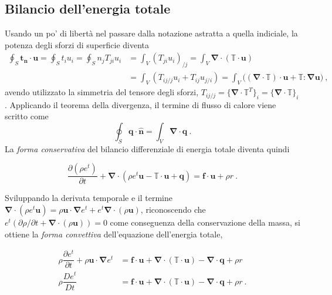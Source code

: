 \subsection{Bilancio dell'energia totale}
Usando un po' di libertà nel passare dalla notazione astratta a quella indiciale, la potenza degli sforzi di superficie diventa
\begin{equation}
\begin{aligned}
 \oint_S \bm{t_n} \cdot \bm{u} = \oint_S t_i u_i = \oint_S n_j T_{ji} u_i & =
  \int_V (T_{ji} u_i)_{/j}= \int_V \bm{\nabla} \cdot ( \mathbb{T} \cdot \bm{u}) \\
  & = \int_V (T_{ij/j} u_i + T_{ij} u_{j/i}) = \int_V \big( (\bm{\nabla} \cdot \mathbb{T}) \cdot \bm{u} + \mathbb{T} : \bm{\nabla} \bm{u} \big) \ , 
\end{aligned} 
\end{equation}
avendo utilizzato la simmetria del tensore degli sforzi, $T_{ij/j} = \{ \bm{\nabla} \cdot \mathbb{T}^T \}_i = \{ \bm{\nabla} \cdot \mathbb{T} \}_i$. Applicando il teorema della divergenza, il termine di flusso di calore viene scritto come
\begin{equation}
 \oint_S \bm{q} \cdot \bm{\hat{n}} = \int_V \bm{\nabla} \cdot \bm{q} \ .
\end{equation}
La \textit{forma conservativa} del bilancio differenziale di energia totale diventa quindi
\begin{fBox}
\begin{equation}
 \dfrac{\partial (\rho e^t)}{\partial t} + \bm{\nabla} \cdot (\rho e^t \bm{u} - \mathbb{T} \cdot \bm{u} + \bm{q}) = \bm{f} \cdot \bm{u} + \rho r \ .
\end{equation}
\end{fBox}
Sviluppando la derivata temporale e il termine $\bm{\nabla} \cdot (\rho e^t \bm{u}) = \rho \bm{u} \cdot \bm{\nabla} e^t + e^t \bm{\nabla} \cdot (\rho \bm{u})$, riconoscendo che $e^t (\partial \rho/\partial t + \bm{\nabla} \cdot (\rho \bm{u}))=0$ come conseguenza della conservazione della massa, si ottiene la \textit{forma convettiva} dell'equazione dell'energia totale,
\begin{fBox}
 \begin{equation}
  \begin{aligned}
   \rho \dfrac{\partial e^t}{\partial t}  +  \rho \bm{u}  \cdot  \bm{\nabla} e^t & = \bm{f} \cdot \bm{u} + \bm{\nabla} \cdot ( \mathbb{T} \cdot \bm{u} ) - \bm{\nabla} \cdot \bm{q} + \rho r \\ 
   \rho \dfrac{D e^t}{D t} & =  \bm{f} \cdot \bm{u} + \bm{\nabla} \cdot ( \mathbb{T} \cdot \bm{u} ) - \bm{\nabla} \cdot \bm{q} + \rho r  \ . \\ 
  \end{aligned}
 \end{equation}
\end{fBox}

